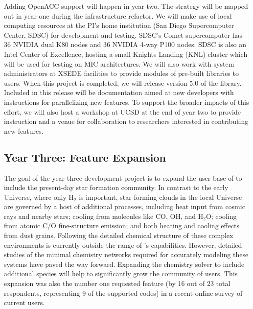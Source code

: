 Adding OpenACC support will happen in year two.  The strategy will be
mapped out in year one during the infrastructure refactor.  We will
make use of local computing resources at the PI's home institution
(San Diego Supercomputer Center, SDSC) for development and testing.
SDSC's Comet supercomputer has 36 NVIDIA dual K80 nodes and 36 NVIDIA
4-way P100 nodes.  SDSC is also an Intel Center of Excellence, hosting
a small Knights Landing (KNL) cluster which will be used for testing
on MIC architectures.
We will also work with system administrators at XSEDE facilities to
provide modules of pre-built \grackle{} libraries to users.  When this
project is completed, we will
release version 5.0 of the \grackle{} library.  Included in this
release will be documentation aimed at new developers with
instructions for parallelizing new features.  To support the broader
impacts of this effort, we will also host a
workshop at UCSD at the end of year two to provide instruction and
a venue for collaboration to researchers interested in contributing
new features.

\subsection{Year Three: Feature Expansion}

The goal of the year three development project is to expand the user
base of \grackle{} to include the present-day star formation
community.  
In contrast to the early Universe, where only H$_{2}$ is important,
star forming clouds in the local Universe are governed by a host of
additional processes, including heat input from cosmic rays and nearby
stars; cooling from molecules like CO, OH, and H$_{2}$O; cooling from
atomic C/O fine-structure emission; and both heating and cooling
effects from dust grains.  Following the detailed chemical structure
of these complex environments is currently outside the range of
\grackle{}'s capabilities.  However, detailed studies of the minimal
chemistry networks required for accurately modeling these systems
\citep{2012MNRAS.421..116G, 2017ApJ...843...38G} have paved the way
forward.  Expanding the chemistry solver to include additional species
will help to significantly grow the community of \grackle{} users.
This expansion was also the number one requested feature (by 16 out of
23 total respondents, representing 9 of the supported codes) in a
recent online survey of current \grackle{} users.

